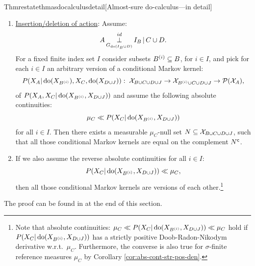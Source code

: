 \begin{restatable}{Thm}{restatethmasdocalculusdetail}[Almost-sure do-calculus---in detail]
\begin{enumerate}
\item \underline{Insertion/deletion of action}: Assume:
            \[ A \operatorname*{\perp}^{id}_{G_{\operatorname{do}(I_B \cup D)}} I_B \operatorname*{|} C  \cup D.  \]
            For a fixed finite index set $I$ consider subsets $B^{(i)} \subseteq B$, for $i \in I$, and pick for each $i \in I$ an arbitrary version of a conditional Markov kernel:
            \[ P(X_A|\operatorname{do}(X_{B^{(i)}}),X_C,\operatorname{do}(X_{D\cup J})):\; \mathcal{X}_{B \cup C \cup D \cup J} \to \mathcal{X}_{B^{(i)} \cup C \cup D \cup J} \to \mathcal{P}(\mathcal{X}_A), \]
            of $P(X_A,X_C|\operatorname{do}(X_{B^{(i)}},X_{D\cup J}))$ and assume the following absolute continuities:
            \[ \mu_C \ll  P(X_C|\operatorname{do}(X_{B^{(i)}},X_{D\cup J})) \]
            for all $i \in I$.
            Then there exists a measurable $\mu_C$-null set
        $N \subseteq \mathcal{X}_{B \cup C \cup D \cup J}$,
        such that all those conditional Markov kernels are equal on the complement $N^{\mathsf{c}}$.
    \item[] If we also assume the reverse absolute continuities for all $i \in I$:
        \[ P(X_C|\operatorname{do}(X_{B^{(i)}},X_{D\cup J})) \ll \mu_C, \]
        then all those conditional Markov kernels are versions of each other.\footnote{Note that absolute continuities: $\mu_C \ll P(X_C|\operatorname{do}(X_{B^{(i)}},X_{D\cup J})) \ll \mu_C$ hold if $P(X_C|\operatorname{do}(X_{B^{(i)}},X_{D\cup J}))$ has a strictly positive Doob-Radon-Nikodym derivative w.r.t.\ $\mu_C$. Furthermore, the converse is also true for $\sigma$-finite reference measures $\mu_C$ by Corollary \ref{cor:abs-cont-str-pos-den}.}
\end{enumerate}
\end{restatable}
The proof can be found in at the end of this section.

